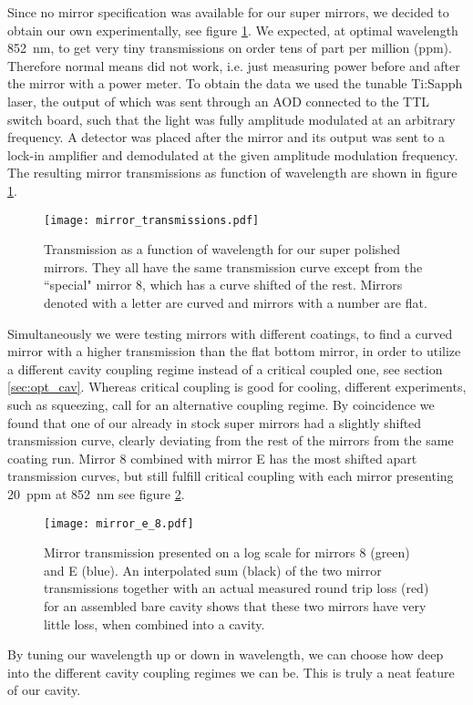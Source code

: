 Since no mirror specification was available for our super mirrors, we decided to obtain our own experimentally, see figure \ref{fig:trans_mirrors}. We expected, at optimal wavelength \SI{852}{\nano\meter}, to get very tiny transmissions on order tens of part per million (ppm). Therefore normal means did not work, i.e. just measuring power before and after the mirror with a power meter. To obtain the data we used the tunable Ti:Sapph laser, the output of which was sent through an AOD connected to the TTL switch board, such that the light was fully amplitude modulated at an arbitrary frequency. A detector was placed after the mirror and its output was sent to a lock-in amplifier and demodulated at the given amplitude modulation frequency. The resulting mirror transmissions as function of wavelength are shown in figure \ref{fig:trans_mirrors}.

\begin{figure}[H]
\centering
\texttt{[image: mirror\_transmissions.pdf]}
\caption{Transmission as a function of wavelength for our super polished mirrors. They all have the same transmission curve except from the ``special" mirror 8, which has a curve shifted of the rest. Mirrors denoted with a letter are curved and mirrors with a number are flat.}
\label{fig:trans_mirrors}
\end{figure}

Simultaneously we were testing mirrors with different coatings, to find a curved mirror with a higher transmission than the flat bottom mirror, in order to utilize a different cavity coupling regime instead of a critical coupled one, see section \ref{sec:opt_cav}. Whereas critical coupling is good for cooling, different experiments, such as squeezing, call for an alternative coupling regime. By coincidence we found that one of our already in stock super mirrors had a slightly shifted transmission curve, clearly deviating from the rest of the mirrors from the same coating run. Mirror 8 combined with mirror E has the most shifted apart transmission curves, but still fulfill critical coupling with each mirror presenting \SI{20}{ppm} at \SI{852}{\nano\meter} see figure \ref{fig:trans_e_8}.


\begin{figure}[H]
\centering
\texttt{[image: mirror\_e\_8.pdf]}
\caption{Mirror transmission presented on a log scale for mirrors 8 (green) and E (blue). An interpolated sum (black) of the two mirror transmissions together with an actual measured round trip loss (red) for an assembled bare cavity shows that these two mirrors have very little loss, when combined into a cavity.}
\label{fig:trans_e_8}
\end{figure}

By tuning our wavelength up or down in wavelength, we can choose how deep into the different cavity coupling regimes we can be. This is truly a neat feature of our cavity.
